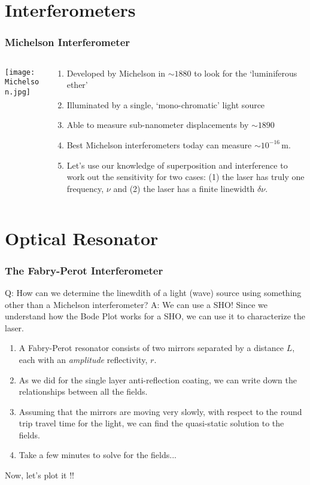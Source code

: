 \documentclass[pdf, hideothersubsections]{beamer}
\begin{document}
\section{Interferometers}
\begin{frame}
\frametitle{Michelson Interferometer}
\begin{columns}
  \begin{column}{0.35\textwidth}
    \texttt{[image: Michelson.jpg]}
  \end{column}

  \begin{column}{0.65\textwidth}
    \begin{enumerate}
    \item Developed by Michelson in $\sim1880$ to look for the
      `luminiferous ether'
      \pause
    \item Illuminated by a single, `mono-chromatic' light source
      \pause
    \item Able to measure sub-nanometer displacements by $\sim1890$
      \pause
    \item Best Michelson interferometers today can measure
      $\sim10^{-16}$\,m.
      \pause
    \item Let's use our knowledge of superposition and interference to
      work out the sensitivity for two cases: \pause
      (1) the laser has truly one frequency, $\nu$ \pause
      and (2) the laser has a finite linewidth $\delta \nu$.
      
    \end{enumerate}
  \end{column}
\end{columns}
\end{frame}

\section{Optical Resonator}
\begin{frame}
\frametitle{The Fabry-Perot Interferometer}
Q: How can we determine the linewdith of a light (wave) source using
something other than a Michelson interferometer?\pause
A: We can use a SHO! Since we understand how the Bode Plot works for a
SHO, we can use it to characterize the laser. \pause

\begin{enumerate}
\item A Fabry-Perot resonator consists of two mirrors separated by a
  distance $L$, each with an \emph{amplitude} reflectivity, $r$.
\pause
\item As we did for the single layer anti-reflection coating, we can
  write down the relationships between all the fields.
\pause
\item Assuming that the mirrors are moving very slowly, with respect
  to the round trip travel time for the light, we can find the
  quasi-static solution to the fields.
\pause
\item Take a few minutes to solve for the fields...
\end{enumerate}
\pause
Now, let's plot it !!
\end{frame}
\end{document}
